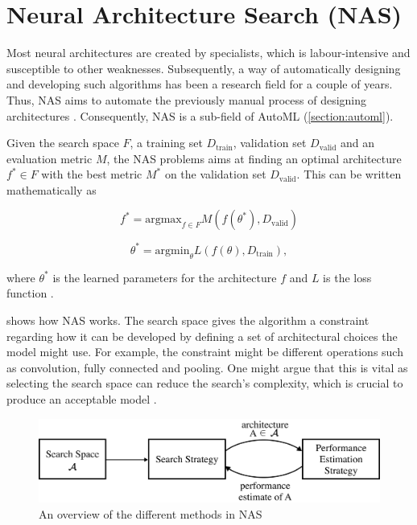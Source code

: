 \section{Neural Architecture Search (NAS)} \label{section:nas}
Most neural architectures are created by specialists, which is labour-intensive and susceptible to other weaknesses. Subsequently, a way of automatically designing and developing such algorithms has been a research field for a couple of years. Thus, \gls{NAS} aims to automate the previously manual process of designing architectures \autocite{elsken2019neural}. Consequently, \gls{NAS} is a sub-field of \gls{AutoML} (\cref{section:automl}). 

Given the search space $F$, a training set $D_{\text{train}}$, validation set $D_{\text{valid}}$ and an evaluation metric $M$, the \gls{NAS} problems aims at finding an optimal architecture $f^* \in F$ with the best metric $M^*$ on the validation set $D_{\text{valid}}$. This can be written mathematically as 

\begin{equation*}
    f^* = \text{argmax}_{f \in F} M(f(\theta^*), D_{\text{valid}}) 
\end{equation*}

\begin{equation*}
    \theta^* = \text{argmin}_{\theta} L(f(\theta), D_{\text{train}}), 
\end{equation*}

where $\theta^*$ is the learned parameters for the architecture $f$ and $L$ is the loss function \autocite{zhou2019auto}. 

 shows how \gls{NAS} works. The search space gives the algorithm a constraint regarding how it can be developed by defining a set of architectural choices the model might use. For example, the constraint might be different operations such as convolution, fully connected and pooling. One might argue that this is vital as selecting the search space can reduce the search's complexity, which is crucial to produce an acceptable model \autocite{kyriakides2020introduction}.

\begin{figure}[h]
    \centering
    \includegraphics[width=12cm]{figures/NAS_overview.png}
    \caption{An overview of the different methods in NAS \autocite{elsken2019neural} }
    \label{fig:nas_overview}
\end{figure}


